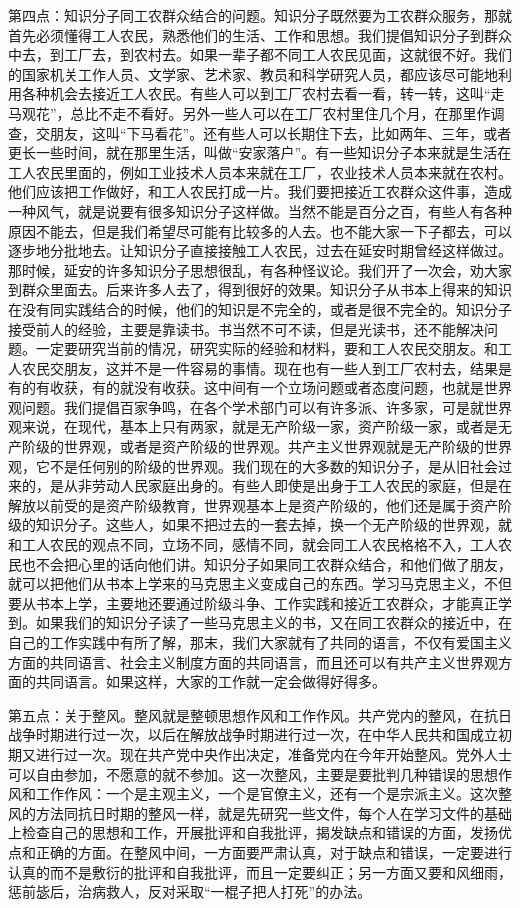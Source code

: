 第四点：知识分子同工农群众结合的问题。知识分子既然要为工农群众服务，那就首先必须懂得工人农民，熟悉他们的生活、工作和思想。我们提倡知识分子到群众中去，到工厂去，到农村去。如果一辈子都不同工人农民见面，这就很不好。我们的国家机关工作人员、文学家、艺术家、教员和科学研究人员，都应该尽可能地利用各种机会去接近工人农民。有些人可以到工厂农村去看一看，转一转，这叫“走马观花”，总比不走不看好。另外一些人可以在工厂农村里住几个月，在那里作调查，交朋友，这叫“下马看花”。还有些人可以长期住下去，比如两年、三年，或者更长一些时间，就在那里生活，叫做“安家落户”。有一些知识分子本来就是生活在工人农民里面的，例如工业技术人员本来就在工厂，农业技术人员本来就在农村。他们应该把工作做好，和工人农民打成一片。我们要把接近工农群众这件事，造成一种风气，就是说要有很多知识分子这样做。当然不能是百分之百，有些人有各种原因不能去，但是我们希望尽可能有比较多的人去。也不能大家一下子都去，可以逐步地分批地去。让知识分子直接接触工人农民，过去在延安时期曾经这样做过。那时候，延安的许多知识分子思想很乱，有各种怪议论。我们开了一次会，劝大家到群众里面去。后来许多人去了，得到很好的效果。知识分子从书本上得来的知识在没有同实践结合的时候，他们的知识是不完全的，或者是很不完全的。知识分子接受前人的经验，主要是靠读书。书当然不可不读，但是光读书，还不能解决问题。一定要研究当前的情况，研究实际的经验和材料，要和工人农民交朋友。和工人农民交朋友，这并不是一件容易的事情。现在也有一些人到工厂农村去，结果是有的有收获，有的就没有收获。这中间有一个立场问题或者态度问题，也就是世界观问题。我们提倡百家争鸣，在各个学术部门可以有许多派、许多家，可是就世界观来说，在现代，基本上只有两家，就是无产阶级一家，资产阶级一家，或者是无产阶级的世界观，或者是资产阶级的世界观。共产主义世界观就是无产阶级的世界观，它不是任何别的阶级的世界观。我们现在的大多数的知识分子，是从旧社会过来的，是从非劳动人民家庭出身的。有些人即使是出身于工人农民的家庭，但是在解放以前受的是资产阶级教育，世界观基本上是资产阶级的，他们还是属于资产阶级的知识分子。这些人，如果不把过去的一套去掉，换一个无产阶级的世界观，就和工人农民的观点不同，立场不同，感情不同，就会同工人农民格格不入，工人农民也不会把心里的话向他们讲。知识分子如果同工农群众结合，和他们做了朋友，就可以把他们从书本上学来的马克思主义变成自己的东西。学习马克思主义，不但要从书本上学，主要地还要通过阶级斗争、工作实践和接近工农群众，才能真正学到。如果我们的知识分子读了一些马克思主义的书，又在同工农群众的接近中，在自己的工作实践中有所了解，那末，我们大家就有了共同的语言，不仅有爱国主义方面的共同语言、社会主义制度方面的共同语言，而且还可以有共产主义世界观方面的共同语言。如果这样，大家的工作就一定会做得好得多。

第五点：关于整风。整风就是整顿思想作风和工作作风。共产党内的整风，在抗日战争时期进行过一次，以后在解放战争时期进行过一次，在中华人民共和国成立初期又进行过一次。现在共产党中央作出决定，准备党内在今年开始整风。党外人士可以自由参加，不愿意的就不参加。这一次整风，主要是要批判几种错误的思想作风和工作作风：一个是主观主义，一个是官僚主义，还有一个是宗派主义。这次整风的方法同抗日时期的整风一样，就是先研究一些文件，每个人在学习文件的基础上检查自己的思想和工作，开展批评和自我批评，揭发缺点和错误的方面，发扬优点和正确的方面。在整风中间，一方面要严肃认真，对于缺点和错误，一定要进行认真的而不是敷衍的批评和自我批评，而且一定要纠正；另一方面又要和风细雨，惩前毖后，治病救人，反对采取“一棍子把人打死”的办法。


